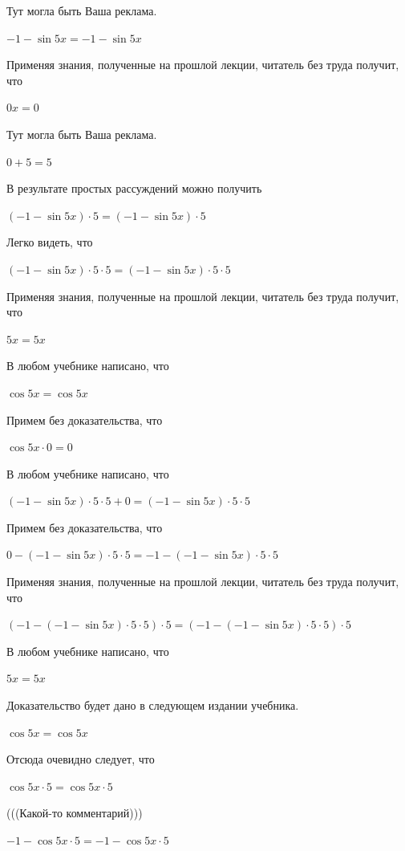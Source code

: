 \documentclass[12pt,a4paper,fleqn]{article}
\theoremstyle{definition}
\begin{document}
Тут могла быть Ваша реклама. 

$ -1  - \sin 5  x  =  -1  - \sin 5  x $

Применяя знания, полученные на прошлой лекции, читатель без труда получит, что 

$ 0  x  =  0 $

Тут могла быть Ваша реклама. 

$ 0  +  5  =  5 $

В результате простых рассуждений можно получить 

$( -1  - \sin 5  x ) \cdot  5  = ( -1  - \sin 5  x ) \cdot  5 $

Легко видеть, что 

$( -1  - \sin 5  x ) \cdot  5  \cdot  5  = ( -1  - \sin 5  x ) \cdot  5  \cdot  5 $

Применяя знания, полученные на прошлой лекции, читатель без труда получит, что 

$ 5  x  =  5  x $

В любом учебнике написано, что 

$\cos 5  x  = \cos 5  x $

Примем без доказательства, что 

$\cos 5  x  \cdot  0  =  0 $

В любом учебнике написано, что 

$( -1  - \sin 5  x ) \cdot  5  \cdot  5  +  0  = ( -1  - \sin 5  x ) \cdot  5  \cdot  5 $

Примем без доказательства, что 

$ 0  - ( -1  - \sin 5  x ) \cdot  5  \cdot  5  =  -1  - ( -1  - \sin 5  x ) \cdot  5  \cdot  5 $

Применяя знания, полученные на прошлой лекции, читатель без труда получит, что 

$( -1  - ( -1  - \sin 5  x ) \cdot  5  \cdot  5 ) \cdot  5  = ( -1  - ( -1  - \sin 5  x ) \cdot  5  \cdot  5 ) \cdot  5 $

В любом учебнике написано, что 

$ 5  x  =  5  x $

Доказательство будет дано в следующем издании учебника. 

$\cos 5  x  = \cos 5  x $

Отсюда очевидно следует, что 

$\cos 5  x  \cdot  5  = \cos 5  x  \cdot  5 $

(((Какой-то комментарий))) 

$ -1  - \cos 5  x  \cdot  5  =  -1  - \cos 5  x  \cdot  5 $
\end{document}
